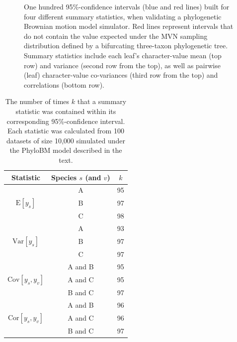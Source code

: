 \documentclass[oneside]{article}
\begin{document}
\begin{figure}
  \centering
  
  \caption{One hundred 95\%-confidence intervals (blue and red lines) built for four different summary statistics, when validating a phylogenetic Brownian motion model simulator.
    Red lines represent intervals that do not contain the value expected under the MVN sampling distribution defined by a bifurcating three-taxon phylogenetic tree.
    Summary statistics include each leaf's character-value mean (top row) and variance (second row from the top), as well as pairwise (leaf) character-value co-variances (third row from the top) and correlations (bottom row).}
  \label{supfig:bmsimcis}
\end{figure}

\begin{table}[h]
  \caption{The number of times $k$ that a summary statistic was contained within its corresponding 95\%-confidence interval.
    Each statistic was calculated from 100 datasets of size 10,000 simulated under the PhyloBM model described in the text.}
  \label{suptab:bmsimcis}
  \centering
  \begin{tabular}{ ccc }
    \hline
    Statistic & Species $s$ (and $v$)& $k$\\
    \hline  
    \rowcolor{gray!10}                      & A & 95\\
    \rowcolor{gray!10} $\text{E}[y_s]$      & B & 97\\
    \rowcolor{gray!10}                      & C & 98\\
                                            & A & 93\\
                       $\text{Var}[y_s]$    & B & 97\\
                                            & C & 97\\
    \rowcolor{gray!10}                      & A and B & 95\\
    \rowcolor{gray!10}$\text{Cov}[y_s,y_v]$ & A and C & 95\\
    \rowcolor{gray!10}                      & B and C & 97\\
                                            & A and B & 96\\
                      $\text{Cor}[y_s,y_v]$ & A and C & 96\\
                                            & B and C & 97\\
    \hline
  \end{tabular}
\end{table}
\end{document}
